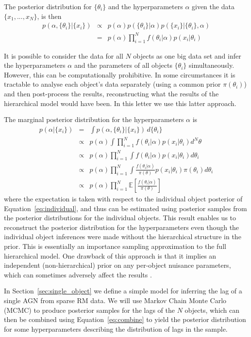 \documentclass[useAMS,usenatbib]{mn2e}
\renewcommand{\btheta}{\{\theta_i\}}
\newcommand{\bx}{\{x_i\}}
\begin{document}
The posterior distribution for
$\btheta$ and the hyperparameters $\alpha$
given the data 
$\{x_1, ..., x_N\}$, is then
\begin{eqnarray}
p(\alpha, \btheta | \bx) &\propto&
p(\alpha)p(\btheta|\alpha)p(\bx | \btheta, \alpha)\\
&=& p(\alpha)\prod_{i=1}^N f(\theta_i|\alpha)p(x_i | \theta_i)
\end{eqnarray}

It is possible to consider the data for all $N$ objects as one big data set
and infer the hyperparameters $\alpha$ and the parameters of all objects $\btheta$
simultaneously. However, this can be
computationally prohibitive. In some circumstances it is tractable to analyse
each object's data separately (using a common prior $\pi(\theta_i)$) and
then post-process the results, reconstructing what the results of the
hierarchical model would have been. In this letter we use this latter approach.

The marginal posterior distribution for the hyperparameters $\alpha$ is
\begin{eqnarray}
p(\alpha | \bx) &=&
\int p(\alpha, \btheta|\bx) \, d\btheta\\
&\propto& p(\alpha)\int \prod_{i=1}^N f(\theta_i|\alpha)p(x_i | \theta_i) d^N\theta\\
&\propto& p(\alpha) \prod_{i=1}^N \int f(\theta_i|\alpha)p(x_i | \theta_i) d\theta_i\\
&\propto& p(\alpha) \prod_{i=1}^N \int \frac{f(\theta_i|\alpha)}{\pi(\theta)}p(x_i | \theta_i) \pi(\theta_i)d\theta_i\\
&\propto& p(\alpha) \prod_{i=1}^N \mathds{E}\left[\frac{f(\theta_i|\alpha)}{\pi(\theta)}\right]\label{eq:combine}
\end{eqnarray}
where the expectation is taken with respect to the individual object posterior
of Equation~\ref{eq:individual}, and thus can be estimated using posterior
samples from the posterior distributions for the individual objects.
This result enables us to reconstruct the
posterior distribution for the hyperparameters even though the individual object
inferences were made without the hierarchical structure in the prior. This is
essentially an importance sampling approximation to the
full hierarchical model. One drawback of this approach is that it implies an
independent (non-hierarchical) prior on any per-object nuisance parameters,
which can sometimes adversely affect the results \citep[e.g.][]{2013arXiv1310.5177B}.

In Section~\ref{sec:single_object} we define a simple model for inferring the
lag of a single AGN from sparse RM data. We will use Markov Chain Monte Carlo
(MCMC) to produce posterior samples for the lags of the $N$ objects, which can
then be combined using Equation~\ref{eq:combine} to yield the posterior
distribution for some hyperparameters describing the distribution of
lags in the sample.
\end{document}
